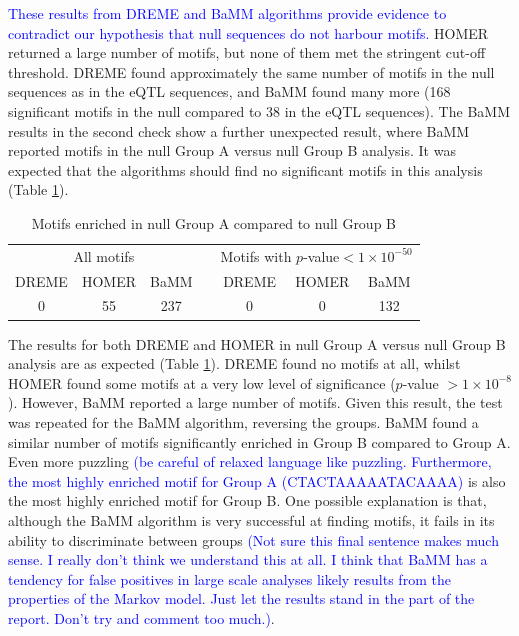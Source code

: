 \documentclass[12pt]{article}
\begin{document}
\textcolor{blue}{These results from DREME and BaMM algorithms provide evidence to contradict our hypothesis that null sequences do not harbour motifs.} HOMER returned a large number of motifs, but none of them met the stringent cut-off threshold. DREME found approximately the same number of motifs in the null sequences as in the eQTL sequences, and BaMM found many more (168 significant motifs in the null compared to 38 in the eQTL sequences).
\newpage
The BaMM results in the second check show a further unexpected result, where BaMM reported motifs in the null Group A versus null Group B analysis. It was expected that the algorithms should find no significant motifs in this analysis (Table \ref{nullHalfGroups}).

\begin{table}[!htbp]
\caption{Motifs enriched in null Group A compared to null Group B}
\label{nullHalfGroups}
\centering
\begin{tabular}{ccccccc}
\toprule[0.2em]
\multicolumn{3}{c}{All motifs} & & \multicolumn{3}{c}{Motifs with $p$-value$<1\times10^{-50}$}\\
\cmidrule[0.1em]{1-3}
\cmidrule[0.1em]{5-7}
DREME & HOMER & BaMM && DREME & HOMER & BaMM\\
0 & 55 & 237 && 0 & 0 & 132\\
\bottomrule[0.2em]
\end{tabular}
\end{table}

The results for both DREME and HOMER in null Group A versus null Group B analysis are as expected (Table \ref{nullHalfGroups}). DREME found no motifs at all, whilst HOMER found some motifs at a very low level of significance ($p$-value $>1\times10^{-8}$). However, BaMM reported a large number of motifs. Given this result, the test was repeated for the BaMM algorithm, reversing the groups. BaMM found a similar number of motifs significantly enriched in Group B compared to Group A. Even more puzzling  \textcolor{blue}{(be careful of relaxed language like puzzling. Furthermore, the most highly enriched motif for Group A (CTACTAAAAATACAAAA)} is also the most highly enriched motif for Group B. One possible explanation is that, although the BaMM algorithm is very successful at finding motifs, it fails in its ability to discriminate between groups \textcolor{blue}{(Not sure this final sentence makes much sense.
I really don't think we understand this at all. I think that BaMM has a tendency for false positives in large scale analyses likely results from the properties
of the Markov model. Just let the results stand in the part of the report. Don't try and comment too much.)}. 
\end{document}
